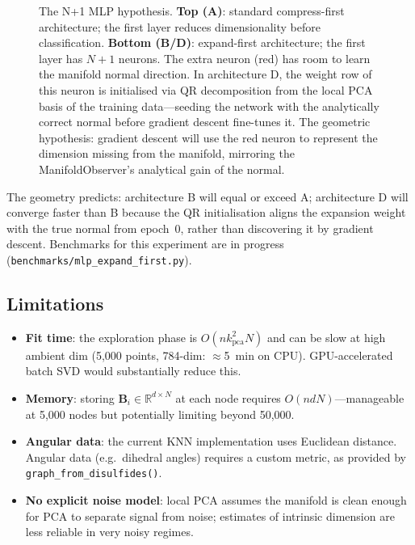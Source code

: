 \documentclass[12pt,letterpaper]{article}
\newcommand{\RR}{\mathbb{R}}
\newcommand{\bB}{\mathbf{B}}
\begin{document}
\begin{figure}[h]
\caption{The N+1 MLP hypothesis.  \textbf{Top (A)}: standard compress-first
architecture; the first layer reduces dimensionality before classification.
\textbf{Bottom (B/D)}: expand-first architecture; the first layer has $N+1$
neurons.  The extra neuron (red) has room to learn the manifold normal direction.
In architecture D, the weight row of this neuron is initialised via QR
decomposition from the local PCA basis of the training data---seeding the
network with the analytically correct normal before gradient descent fine-tunes
it.  The geometric hypothesis: gradient descent will use the red neuron to
represent the dimension missing from the manifold, mirroring the ManifoldObserver's
analytical gain of the normal.}
\label{fig:n1mlp}
\end{figure}

The geometry predicts: architecture B will equal or exceed A; architecture D
will converge faster than B because the QR initialisation aligns the expansion
weight with the true normal from epoch~0, rather than discovering it by
gradient descent.  Benchmarks for this experiment are in progress
(\texttt{benchmarks/mlp\_expand\_first.py}).

\subsection{Limitations}

\begin{itemize}[leftmargin=*]
  \item \textbf{Fit time}: the exploration phase is $O(n k_\text{pca}^2 N)$ and
    can be slow at high ambient dim (5{,}000 points, 784-dim: $\approx$5~min on
    CPU).  GPU-accelerated batch SVD would substantially reduce this.
  \item \textbf{Memory}: storing $\bB_i \in \RR^{d \times N}$ at each node
    requires $O(ndN)$---manageable at 5{,}000 nodes but potentially limiting
    beyond 50{,}000.
  \item \textbf{Angular data}: the current KNN implementation uses Euclidean
    distance.  Angular data (e.g.\ dihedral angles) requires a custom metric, as
    provided by \texttt{graph\_from\_disulfides()}.
  \item \textbf{No explicit noise model}: local PCA assumes the manifold is
    clean enough for PCA to separate signal from noise; estimates of intrinsic
    dimension are less reliable in very noisy regimes.
\end{itemize}
\end{document}
